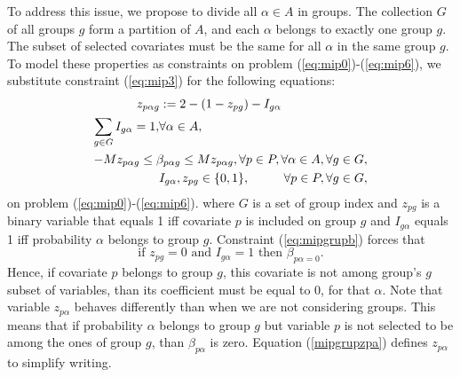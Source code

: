 To address this issue, we propose to divide all $\alpha \in A$ in groups. The collection $G$ of all groups $g$ form a partition of $A$, and each $\alpha$ belongs to exactly one group $g$. 
The subset of selected covariates must be the same for all $\alpha$ in the same group $g$. To model these properties as constraints on problem (\ref{eq:mip0})-(\ref{eq:mip6}), we substitute constraint (\ref{eq:mip3}) for the following equations:
\begin{align}
z_{p \alpha g} := 2 - ( 1-z_{pg}) - I_{g\alpha}\span \span \label{mipgrupzpa} \\
\sum\limits_{g \in G} I_{g\alpha} = 1, & \forall \alpha \in A,\label{eq:mipgrupa}& \\
-Mz_{p \alpha g}  \leq  \beta_{p \alpha g} \leq M z_{p \alpha g}, \forall p \in P, \forall \alpha \in A,  \forall g \in G, \span \span \label{eq:mipgrupb} \\
&I_{g\alpha}, z_{pg} \in \{0,1\},& \, \forall p \in P,  \forall g \in G, \label{eq:mipgrupc}
\end{align}
on problem (\ref{eq:mip0})-(\ref{eq:mip6}).
where $G$ is a set of group index and $z_{pg}$ is a binary variable that equals 1 iff covariate $p$ is included on group $g$ and $I_{g\alpha}$ equals 1 iff probability $\alpha$ belongs to group $g$. 
Constraint (\ref{eq:mipgrupb}) forces that 
$$\text{if }z_{pg} = 0 \text{ and }I_{g\alpha} =1 \text{ then } \beta_{p \alpha = 0}. $$
Hence, if covariate $p$ belongs to group $g$, this covariate is not among group's $g$ subset of variables, than its coefficient must be equal to $0$, for that $\alpha$.
Note that variable $z_{p \alpha}$ behaves differently than when we are not considering groups. This means that if probability $\alpha$ belongs to group $g$ but variable $p$ is not selected to be among the ones of group $g$, than $\beta_{p\alpha}$ is zero.
Equation (\ref{mipgrupzpa}) defines $z_{p\alpha}$ to simplify writing.


